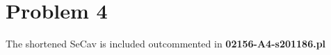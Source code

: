 \newpage
\section*{Problem 4}
The shortened SeCav is included outcommented in \textbf{02156-A4-s201186.pl}
